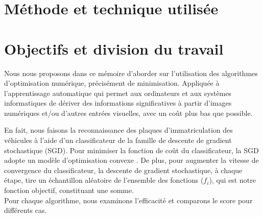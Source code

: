 		
			
	\section{Méthode et technique utilisée}
	
	\section{Objectifs et division du travail}
		
		Nous nous proposons dans ce mémoire d'aborder sur l'utilisation des algorithmes d'optimisation numérique, précisément de minimisation. Appliquée à l'apprentissage automatique qui permet aux ordinateurs et aux systèmes informatiques de dériver des informations significatives à partir d'images numériques et/ou d'autres entrées visuelles, avec un coût plus bas que possible.  
		
		En fait, nous faisons la reconnaissance des plaques d’immatriculation des véhicules à l'aide d’un classificateur de la famille de descente de gradient stochastique (SGD). Pour minimiser la fonction de coût du classificateur, la SGD adopte un modèle d'optimisation convexe \cite{deepa2021ai}. De plus, pour augmenter la vitesse de convergence du classificateur, la descente de gradient stochastique, à chaque étape, tire un échantillon aléatoire de l'ensemble des fonctions ($f_i$), qui est notre fonction objectif, constituant une somme.\\
		Pour chaque algorithme, nous examinons l'efficacité et comparons le score pour différents cas.
		
